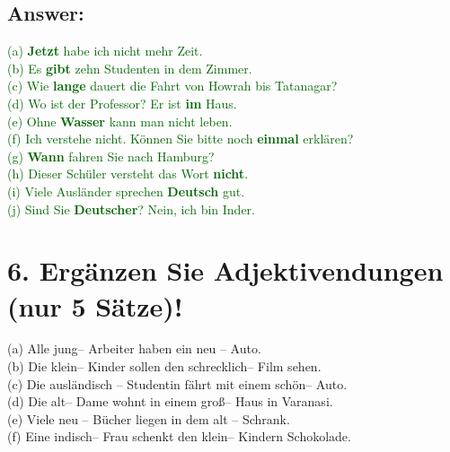 \documentclass[a4paper,12pt]{article}
\begin{document}
\subsection*{Answer:}
\textcolor{darkgreen}{(a) \textbf{Jetzt} habe ich nicht mehr Zeit.}\\
\textcolor{darkgreen}{(b) Es \textbf{gibt} zehn Studenten in dem Zimmer.}\\
\textcolor{darkgreen}{(c) Wie \textbf{lange} dauert die Fahrt von Howrah bis Tatanagar?}\\
\textcolor{darkgreen}{(d) Wo ist der Professor? Er ist \textbf{im} Haus.}\\
\textcolor{darkgreen}{(e) Ohne \textbf{Wasser} kann man nicht leben.}\\
\textcolor{darkgreen}{(f) Ich verstehe nicht. Können Sie bitte noch \textbf{einmal} erklären?}\\
\textcolor{darkgreen}{(g) \textbf{Wann} fahren Sie nach Hamburg?}\\
\textcolor{darkgreen}{(h) Dieser Schüler versteht das Wort \textbf{nicht}.}\\
\textcolor{darkgreen}{(i) Viele Ausländer sprechen \textbf{Deutsch} gut.}\\
\textcolor{darkgreen}{(j) Sind Sie \textbf{Deutscher}? Nein, ich bin Inder.}\\


\vspace{1cm}

\section*{6. Ergänzen Sie Adjektivendungen (nur 5 Sätze)!}

(a) Alle jung-- Arbeiter haben ein neu -- Auto.\\
(b) Die klein-- Kinder sollen den schrecklich-- Film sehen.\\
(c) Die ausländisch -- Studentin fährt mit einem schön-- Auto.\\
(d) Die alt-- Dame wohnt in einem groß-- Haus in Varanasi.\\
(e) Viele neu -- Bücher liegen in dem alt -- Schrank.\\
(f) Eine indisch-- Frau schenkt den klein-- Kindern Schokolade.
\end{document}
